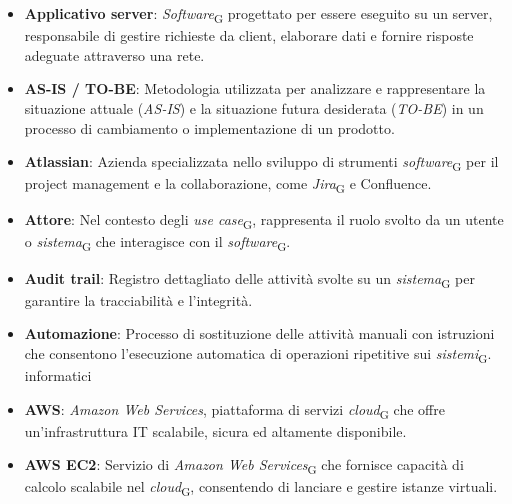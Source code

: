\begin{itemize}
    \item \textbf{Applicativo server}: \textit{Software}\textsubscript{G} progettato per essere eseguito su un server, responsabile di gestire richieste da client, elaborare dati e fornire risposte adeguate attraverso una rete.
    \item \textbf{AS-IS / TO-BE}: Metodologia utilizzata per analizzare e rappresentare la situazione attuale (\textit{AS-IS}) e la situazione futura desiderata (\textit{TO-BE}) in un processo di cambiamento o implementazione di un prodotto.
    \item \textbf{Atlassian}: Azienda specializzata nello sviluppo di strumenti \textit{software}\textsubscript{G} per il project management e la collaborazione, come \textit{Jira}\textsubscript{G} e Confluence.
    \item \textbf{Attore}: Nel contesto degli \textit{use case}\textsubscript{G}, rappresenta il ruolo svolto da un utente o \textit{sistema}\textsubscript{G} che interagisce con il \textit{software}\textsubscript{G}.
    \item \textbf{Audit trail}: Registro dettagliato delle attività svolte su un \textit{sistema}\textsubscript{G} per garantire la tracciabilità e l’integrità.
    \item \textbf{Automazione}: Processo di sostituzione delle attività manuali con istruzioni che consentono l'esecuzione automatica di operazioni ripetitive sui \textit{sistemi}\textsubscript{G}. informatici
    \item \textbf{AWS}: \textit{Amazon Web Services}, piattaforma di servizi \textit{cloud}\textsubscript{G} che offre un'infrastruttura IT scalabile, sicura ed altamente disponibile.
    \item \textbf{AWS EC2}: Servizio di \textit{Amazon Web Services}\textsubscript{G} che fornisce capacità di calcolo scalabile nel \textit{cloud}\textsubscript{G}, consentendo di lanciare e gestire istanze virtuali.
\end{itemize}
